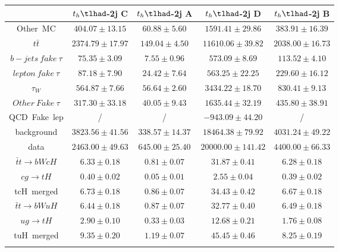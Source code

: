 \begin{tabular}{ccccc} \toprule\toprule
 & $t_{h}\tlhad$-2j C & $t_{h}\tlhad$-2j A & $t_{h}\tlhad$-2j D & $t_{h}\tlhad$-2j B\\\midrule
Other~MC & $404.07\pm13.15$ & $60.88\pm5.60$ & $1591.41\pm29.86$ & $383.91\pm16.39$\\
$t\bar{t}$ & $2374.79\pm17.97$ & $149.04\pm4.50$ & $11610.06\pm39.82$ & $2038.00\pm16.73$\\
$b-jets~fake~\tau$ & $75.35\pm3.09$ & $7.55\pm0.96$ & $573.09\pm8.69$ & $113.52\pm4.10$\\
$lepton~fake~\tau$ & $87.18\pm7.90$ & $24.42\pm7.64$ & $563.25\pm22.25$ & $229.60\pm16.12$\\
$\tau_{W}$ & $564.87\pm7.66$ & $56.64\pm2.60$ & $3434.22\pm18.70$ & $830.41\pm9.13$\\
$Other~Fake~\tau$ & $317.30\pm33.18$ & $40.05\pm9.43$ & $1635.44\pm32.19$ & $435.80\pm38.91$\\
QCD~Fake~lep &  / &  / & $-943.09\pm44.20$ &  /\\
background & $3823.56\pm41.56$ & $338.57\pm14.37$ & $18464.38\pm79.92$ & $4031.24\pm49.22$\\
data & $2463.00\pm49.63$ & $645.00\pm25.40$ & $20000.00\pm141.42$ & $4400.00\pm66.33$\\
$\bar{t}t\to bWcH$ & $6.33\pm0.18$ & $0.81\pm0.07$ & $31.87\pm0.41$ & $6.28\pm0.18$\\
$cg\to tH$ & $0.40\pm0.02$ & $0.05\pm0.01$ & $2.55\pm0.04$ & $0.39\pm0.02$\\
tcH~merged & $6.73\pm0.18$ & $0.86\pm0.07$ & $34.43\pm0.42$ & $6.67\pm0.18$\\
$\bar{t}t\to bWuH$ & $6.44\pm0.18$ & $0.87\pm0.07$ & $32.77\pm0.40$ & $6.49\pm0.18$\\
$ug\to tH$ & $2.90\pm0.10$ & $0.33\pm0.03$ & $12.68\pm0.21$ & $1.76\pm0.08$\\
tuH~merged & $9.35\pm0.20$ & $1.19\pm0.07$ & $45.45\pm0.46$ & $8.25\pm0.19$\\
\bottomrule\bottomrule\\
\end{tabular}
